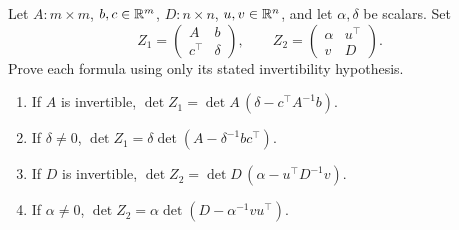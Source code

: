 \begin{problem}\label{ex:05:scalar-pivots}
Let \(A:m\times m\), \(b,c\in\mathbb R^m\), \(D:n\times n\),
\(u,v\in\mathbb R^n\), and let \(\alpha,\delta\) be scalars. Set
\[
Z_1=\begin{pmatrix}A&b\\c^\top&\delta\end{pmatrix},\qquad
Z_2=\begin{pmatrix}\alpha&u^\top\\v&D\end{pmatrix}.
\]
Prove each formula using only its stated invertibility hypothesis.
\begin{enumerate}
\item If \(A\) is invertible, \(\det Z_1=\det A\,(\delta-c^\top A^{-1}b)\).
\item If \(\delta\ne0\), \(\det Z_1=\delta\det(A-\delta^{-1}bc^\top)\).
\item If \(D\) is invertible, \(\det Z_2=\det D\,(\alpha-u^\top D^{-1}v)\).
\item If \(\alpha\ne0\), \(\det Z_2=\alpha\det(D-\alpha^{-1}vu^\top)\).
\end{enumerate}
\end{problem}
